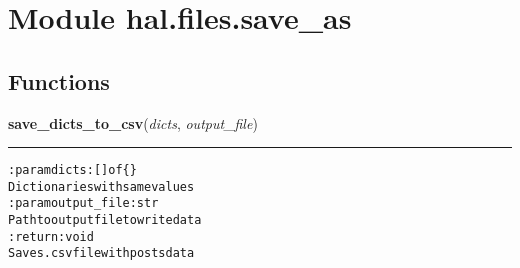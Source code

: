 %
%
%


\section{Module hal.files.save\_as}

    \label{hal:files:save_as}


  \subsection{Functions}

    \label{hal:files:save_as:save_dicts_to_csv}

    \vspace{0.5ex}

\hspace{.8\funcindent}\begin{boxedminipage}{\funcwidth}

    \raggedright \textbf{save\_dicts\_to\_csv}(\textit{dicts}, \textit{output\_file})

    \vspace{-1.5ex}

    \rule{\textwidth}{0.5\fboxrule}
\setlength{\parskip}{2ex}
\begin{alltt}

:param dicts: [] of \{\}
    Dictionaries with same values
:param output\_file: str
    Path to output file to write data
:return: void
    Saves .csv file with posts data
\end{alltt}

\setlength{\parskip}{1ex}
    \end{boxedminipage}

